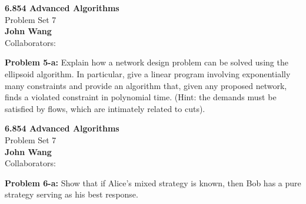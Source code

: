 \documentclass[psamsfonts]{amsart}
\newenvironment{sol}{\vspace{0.25cm}{\large \bfseries Solution:}}{\qedsymbol}
\newenvironment{prob}[1]{\begin{framed}{\large \bfseries Problem #1:}}{\end{framed}}
\newcommand{\makenewtitle}{
    \begin{center}
    {\huge \bfseries 6.854 Advanced Algorithms} \\
    Problem Set 7\\
    \vspace{0.25cm}
    {\bfseries John Wang} \\
    Collaborators: 
    \end{center}
    \vspace{0.5cm}
}
\begin{document}
\newpage
\makenewtitle

\begin{prob}{5-a}
Explain how a network design problem can be solved using the ellipsoid algorithm. In particular, give a linear program involving exponentially many constraints and provide an algorithm that, given any proposed network, finds a violated constraint in polynomial time. (Hint: the demands must be satisfied by flows, which are intimately related to cuts).
\end{prob}
\begin{sol}
\end{sol}

\newpage
\makenewtitle

\begin{prob}{6-a}
Show that if Alice's mixed strategy is known, then Bob has a pure strategy serving as his best response.
\end{prob}
\begin{sol}

\end{sol}
\end{document}
